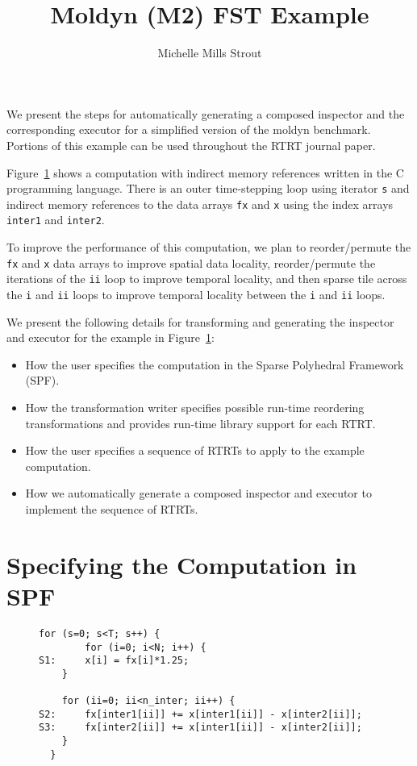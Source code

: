 \documentclass{article}
\title{Moldyn (M2) FST Example}
\author{Michelle Mills Strout}
\begin{document}
\maketitle

We present the steps for automatically generating a composed inspector and the corresponding executor for a simplified version of the moldyn benchmark.  Portions of this example can be used throughout the RTRT journal paper.


Figure~\ref{fig:benchmark} shows a computation with indirect memory references 
written in the C programming language.
There is an outer time-stepping loop using iterator {\tt s} and indirect memory references
to the data arrays {\tt fx} and {\tt x} using the index arrays {\tt inter1} and {\tt inter2}.

To improve the performance of this computation, we plan to reorder/permute the {\tt fx} and {\tt x}
data arrays to improve spatial data locality, reorder/permute the iterations of the {\tt ii} loop 
to improve temporal locality, and then sparse tile across the {\tt i} and {\tt ii} loops to improve
temporal locality between the {\tt i} and {\tt ii} loops.

We present the following details for transforming and generating the inspector and executor
for the example in Figure~\ref{fig:benchmark}:
	\begin{itemize}
	\item How the user specifies the computation in the Sparse Polyhedral Framework (SPF).
	\item How the transformation writer specifies possible run-time reordering transformations and provides run-time library support for each RTRT.
	\item How the user specifies a sequence of RTRTs to apply to the example computation.
	\item How we automatically generate a composed inspector and executor to implement the sequence of RTRTs.
	\end{itemize}


\section{Specifying the Computation in SPF}

\begin{figure}
\begin{minipage}[t][1\totalheight]{1\columnwidth}%
\begin{lstlisting}[basicstyle=\scriptsize, mathescape,emptylines=0]
  for (s=0; s<T; s++) {
        for (i=0; i<N; i++) {
S1:     x[i] = fx[i]*1.25;
	}

    for (ii=0; ii<n_inter; ii++) {
S2:     fx[inter1[ii]] += x[inter1[ii]] - x[inter2[ii]]; 
S3:     fx[inter2[ii]] += x[inter1[ii]] - x[inter2[ii]]; 
    }
  }
\end{lstlisting}%
\end{minipage}%
\caption{ }
\label{fig:benchmark}
\end{figure}
\end{document}
